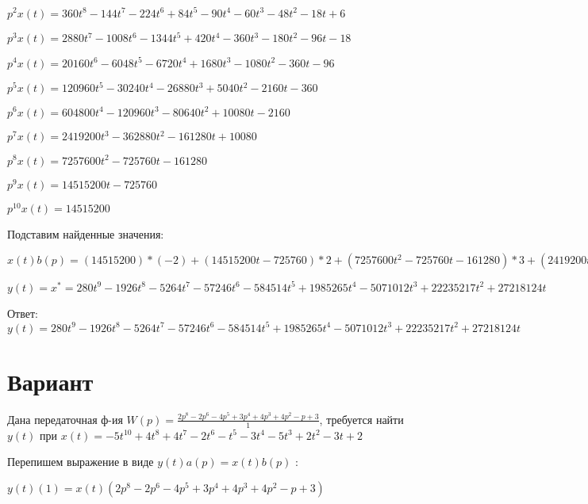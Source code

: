 \documentclass{article}
\begin{document}
{{{{$p^2x(t)=360t^{8}-144t^{7}-224t^{6}+84t^{5}-90t^{4}-60t^{3}-48t^{2}-18t+6$

$p^3x(t)=2880t^{7}-1008t^{6}-1344t^{5}+420t^{4}-360t^{3}-180t^{2}-96t-18$

$p^4x(t)=20160t^{6}-6048t^{5}-6720t^{4}+1680t^{3}-1080t^{2}-360t-96$

$p^5x(t)=120960t^{5}-30240t^{4}-26880t^{3}+5040t^{2}-2160t-360$

$p^6x(t)=604800t^{4}-120960t^{3}-80640t^{2}+10080t-2160$

$p^7x(t)=2419200t^{3}-362880t^{2}-161280t+10080$

$p^8x(t)=7257600t^{2}-725760t-161280$

$p^9x(t)=14515200t-725760$

$p^10x(t)=14515200$

Подставим найденные значения:

$x(t)b(p) = (14515200)*(-2)+(14515200t-725760)*2+(7257600t^{2}-725760t-161280)*3+(2419200t^{3}-362880t^{2}-161280t+10080)*(-2)+(604800t^{4}-120960t^{3}-80640t^{2}+10080t-2160)*3+(120960t^{5}-30240t^{4}-26880t^{3}+5040t^{2}-2160t-360)*(-5)+(20160t^{6}-6048t^{5}-6720t^{4}+1680t^{3}-1080t^{2}-360t-96)*(-3)+(2880t^{7}-1008t^{6}-1344t^{5}+420t^{4}-360t^{3}-180t^{2}-96t-18)*(-2)+(360t^{8}-144t^{7}-224t^{6}+84t^{5}-90t^{4}-60t^{3}-48t^{2}-18t+6)*(-5)+(40t^{9}-18t^{8}-32t^{7}+14t^{6}-18t^{5}-15t^{4}-16t^{3}-9t^{2}+6t-2)*4+(40t^{9}-18t^{8}-32t^{7}+14t^{6}-18t^{5}-15t^{4}-16t^{3}-9t^{2}+6t-2)*3=280t^{9}-1926t^{8}-5264t^{7}-57246t^{6}-584514t^{5}+1985265t^{4}-5071012t^{3}+22235217t^{2}+27218124t$





$y(t)=x^*=280t^{9}-1926t^{8}-5264t^{7}-57246t^{6}-584514t^{5}+1985265t^{4}-5071012t^{3}+22235217t^{2}+27218124t$

Ответ: $y(t) = 280t^{9}-1926t^{8}-5264t^{7}-57246t^{6}-584514t^{5}+1985265t^{4}-5071012t^{3}+22235217t^{2}+27218124t$

\section{Вариант}

Дана передаточная ф-ия $W(p)=\frac{2p^{8}-2p^{6}-4p^{5}+3p^{4}+4p^{3}+4p^{2}-p+3}{1}$, требуется найти $y(t)$ при $x(t)=-5t^{10}+4t^{8}+4t^{7}-2t^{6}-t^{5}-3t^{4}-5t^{3}+2t^{2}-3t+2$

Перепишем выражение в виде $y(t)a(p)=x(t)b(p)$ :

$y(t)(1)=x(t)(2p^{8}-2p^{6}-4p^{5}+3p^{4}+4p^{3}+4p^{2}-p+3)$

}}}}
\end{document}
